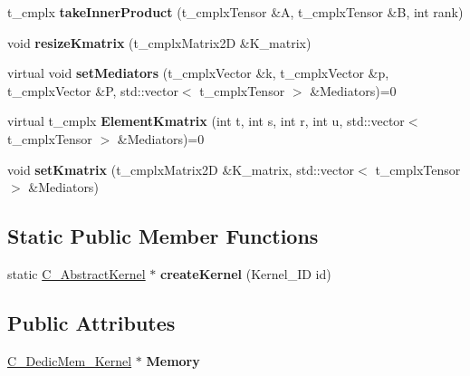 \begin{DoxyCompactItemize}
\item 
\hypertarget{class_c___abstract_kernel_a1bc1d99206e76ab535e2b22c65587b66}{t\-\_\-cmplx {\bfseries take\-Inner\-Product} (t\-\_\-cmplx\-Tensor \&A, t\-\_\-cmplx\-Tensor \&B, int rank)}\label{class_c___abstract_kernel_a1bc1d99206e76ab535e2b22c65587b66}

\item 
\hypertarget{class_c___abstract_kernel_a2f2a68781d4bcd8cb7e12f6ae149f22f}{void {\bfseries resize\-Kmatrix} (t\-\_\-cmplx\-Matrix2\-D \&K\-\_\-matrix)}\label{class_c___abstract_kernel_a2f2a68781d4bcd8cb7e12f6ae149f22f}

\item 
\hypertarget{class_c___abstract_kernel_a93c0cd44a8327c5afa956f39713bc94a}{virtual void {\bfseries set\-Mediators} (t\-\_\-cmplx\-Vector \&k, t\-\_\-cmplx\-Vector \&p, t\-\_\-cmplx\-Vector \&P, std\-::vector$<$ t\-\_\-cmplx\-Tensor $>$ \&Mediators)=0}\label{class_c___abstract_kernel_a93c0cd44a8327c5afa956f39713bc94a}

\item 
\hypertarget{class_c___abstract_kernel_ad90e029ee7da0a8aee835a0e12ee569f}{virtual t\-\_\-cmplx {\bfseries Element\-Kmatrix} (int t, int s, int r, int u, std\-::vector$<$ t\-\_\-cmplx\-Tensor $>$ \&Mediators)=0}\label{class_c___abstract_kernel_ad90e029ee7da0a8aee835a0e12ee569f}

\item 
\hypertarget{class_c___abstract_kernel_a8a46c6a478ff8c4cef966a011ddf4cc3}{void {\bfseries set\-Kmatrix} (t\-\_\-cmplx\-Matrix2\-D \&K\-\_\-matrix, std\-::vector$<$ t\-\_\-cmplx\-Tensor $>$ \&Mediators)}\label{class_c___abstract_kernel_a8a46c6a478ff8c4cef966a011ddf4cc3}

\end{DoxyCompactItemize}
\subsection*{Static Public Member Functions}
\begin{DoxyCompactItemize}
\item 
\hypertarget{class_c___abstract_kernel_a8e4523d9df8882a20b01e511d05815f0}{static \hyperlink{class_c___abstract_kernel}{C\-\_\-\-Abstract\-Kernel} $\ast$ {\bfseries create\-Kernel} (Kernel\-\_\-\-I\-D id)}\label{class_c___abstract_kernel_a8e4523d9df8882a20b01e511d05815f0}

\end{DoxyCompactItemize}
\subsection*{Public Attributes}
\begin{DoxyCompactItemize}
\item 
\hypertarget{class_c___abstract_kernel_a490aac141740e9ee3c4d2b0c0dcb77c7}{\hyperlink{class_c___dedic_mem___kernel}{C\-\_\-\-Dedic\-Mem\-\_\-\-Kernel} $\ast$ {\bfseries Memory}}\label{class_c___abstract_kernel_a490aac141740e9ee3c4d2b0c0dcb77c7}

\end{DoxyCompactItemize}
